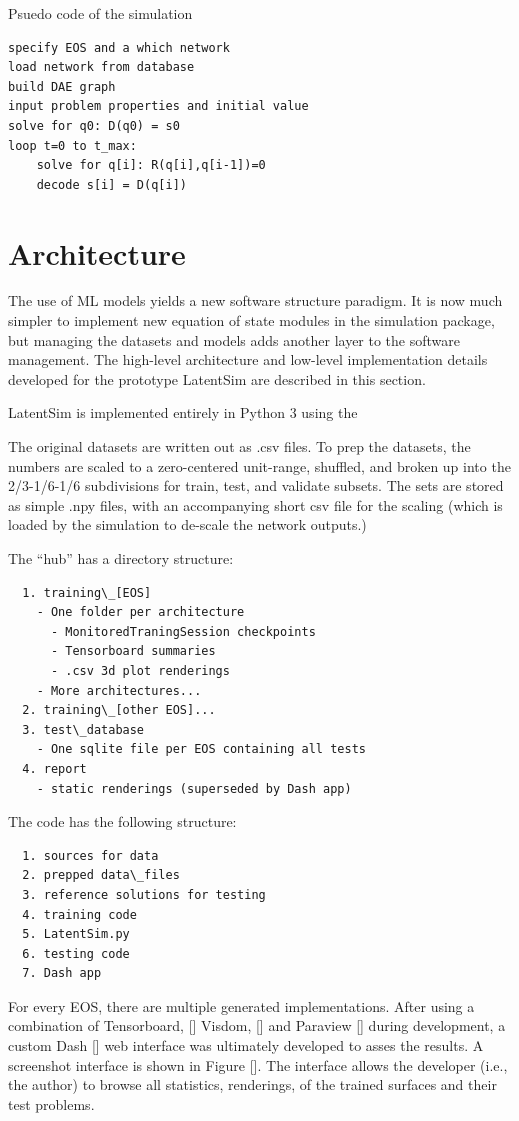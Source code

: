\documentclass[AMA,STIX1COL]{WileyNJD-v2}
\begin{document}
\begin{algorithm}
  \caption{Psuedo code of the simulation}
\begin{verbatim}
specify EOS and a which network
load network from database
build DAE graph
input problem properties and initial value
solve for q0: D(q0) = s0
loop t=0 to t_max:
    solve for q[i]: R(q[i],q[i-1])=0
    decode s[i] = D(q[i])
\end{verbatim}
  \end{algorithm}

\hypertarget{header-n3356}{%
\section{Architecture}\label{header-n3356}}

The use of ML models yields a new software structure paradigm. It is now much simpler to implement new equation of state modules in
the simulation package, but managing the datasets and models adds
another layer to the software management. The high-level architecture
and low-level implementation details developed for the prototype
LatentSim are described in this section.

LatentSim is implemented entirely in Python 3 using the 

The original datasets are written out as .csv files. To prep the
datasets, the numbers are scaled to a zero-centered unit-range, shuffled, and broken up into the
2/3-1/6-1/6 subdivisions for train, test, and validate subsets. The
sets are stored as simple .npy files, with an accompanying short csv file
for the scaling (which is loaded by the simulation to de-scale the
network outputs.)


The ``hub'' has a directory structure:
\begin{verbatim}
  1. training\_[EOS]
    - One folder per architecture
      - MonitoredTraningSession checkpoints
      - Tensorboard summaries
      - .csv 3d plot renderings
    - More architectures...
  2. training\_[other EOS]...
  3. test\_database
    - One sqlite file per EOS containing all tests
  4. report
    - static renderings (superseded by Dash app)
\end{verbatim}
The code has the following structure:
\begin{verbatim}
  1. sources for data
  2. prepped data\_files
  3. reference solutions for testing
  4. training code
  5. LatentSim.py
  6. testing code
  7. Dash app
\end{verbatim}
For every EOS, there are multiple generated implementations.
After using a combination of Tensorboard, [] Visdom, [] and Paraview [] during
development, a custom Dash [] web interface was ultimately developed
to asses the results. A screenshot interface is shown in Figure []. The
interface allows the developer (i.e., the author) to browse all
statistics, renderings, of the trained surfaces and their test
problems.
\end{document}
